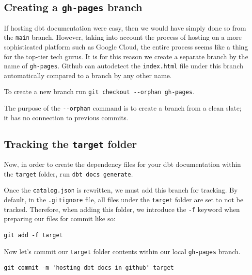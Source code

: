 \documentclass[
]{book}
\begin{document}
\hypertarget{creating-a-gh-pages-branch}{%
\subsection{\texorpdfstring{Creating a \texttt{gh-pages} branch}{Creating a gh-pages branch}}\label{creating-a-gh-pages-branch}}

If hosting dbt documentation were easy, then we would have simply done so from the \texttt{main} branch. However, taking into account the process of hosting on a more sophisticated platform such as Google Cloud, the entire process seems like a thing for the top-tier tech gurus. It is for this reason we create a separate branch by the name of \texttt{gh-pages}. Github can autodetect the \texttt{index.html} file under this branch automatically compared to a branch by any other name.

To create a new branch run \texttt{git\ checkout\ -\/-orphan\ gh-pages}.

The purpose of the \texttt{-\/-orphan} command is to create a branch from a clean slate; it has no connection to previous commits.

\hypertarget{tracking-the-target-folder}{%
\subsection{\texorpdfstring{Tracking the \texttt{target} folder}{Tracking the target folder}}\label{tracking-the-target-folder}}

Now, in order to create the dependency files for your dbt documentation within the \texttt{target} folder, run \texttt{dbt\ docs\ generate}.

Once the \texttt{catalog.json} is rewritten, we must add this branch for tracking. By default, in the \texttt{.gitignore} file, all files under the \texttt{target} folder are set to not be tracked. Therefore, when adding this folder, we introduce the \texttt{-f} keyword when preparing our files for commit like so:

\begin{verbatim}
git add -f target
\end{verbatim}

Now let's commit our \texttt{target} folder contents within our local \texttt{gh-pages} branch.

\begin{verbatim}
git commit -m 'hosting dbt docs in github' target
\end{verbatim}
\end{document}
